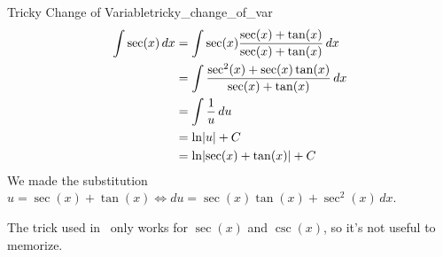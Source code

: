 \begin{Example}{Tricky Change of Variable}{tricky_change_of_var}
    \begin{align*}
        \int \sec(x)\, d{x}
         & =\int \sec(x)\frac{\sec(x)+\tan(x)}{\sec(x)+\tan(x)}\, d{x}    \\
         & =\int \frac{\sec^2(x)+\sec(x)\tan(x)}{\sec(x)+\tan(x)} \, d{x} \\
         & =\int \frac{1}{u}\, d{u}                                       \\
         & =\ln\lvert u\rvert+C                                                  \\
         & =\ln\lvert\sec(x)+\tan(x)\rvert+C
    \end{align*}
    We made the substitution $ u=\sec(x)+\tan(x)\iff du=\sec(x)\tan(x)+\sec^2(x)\,dx $.
\end{Example}

\begin{Remark}{}{}
    The trick used in~ only works for $ \sec(x) $ and
    $ \csc(x) $, so it's not useful to memorize.
\end{Remark}
